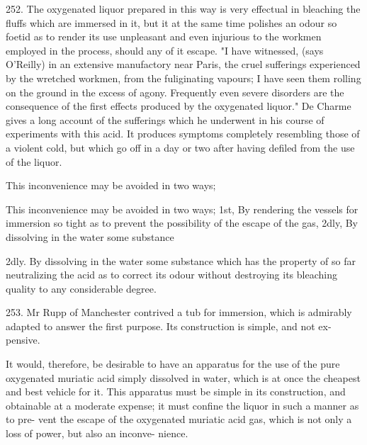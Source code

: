 \documentclass{article}
\begin{document}
252. The oxygenated liquor prepared in this way is very effectual in bleaching the fluffs which are immersed in it, but it at the same time polishes an odour so foetid as to render its use unpleasant and even injurious to the workmen employed in the process, should any of it escape. "I have witnessed, (says O'Reilly) in an extensive manufactory near Paris, the cruel sufferings experienced by the wretched workmen, from the fuliginating vapours; I have seen them rolling on the ground in the excess of agony. Frequently even severe disorders are the consequence of the first effects produced by the oxygenated liquor." De Charme gives a long account of the sufferings which he underwent in his course of experiments with this acid. It produces symptoms completely resembling those of a violent cold, but which go off in a day or two after having defiled from the use of the liquor.

This inconvenience may be avoided in two ways;

This inconvenience may be avoided in two ways; 1st, By rendering the vessels for immersion so tight as to prevent the possibility of the escape of the gas, 2dly, By dissolving in the water some substance

2dly. By dissolving in the water some substance which has the property of so far neutralizing the acid as to correct its odour without destroying its bleaching quality to any considerable degree.

253. Mr Rupp of Manchester contrived a tub for
immersion, which is admirably adapted to answer the
first purpose. Its construction is simple, and not ex-
pensive.

It would, therefore, be desirable to have an apparatus
for the use of the pure oxygenated muriatic acid simply
dissolved in water, which is at once the cheapest and
best vehicle for it. This apparatus must be simple in
its construction, and obtainable at a moderate expense;
it must confine the liquor in such a manner as to pre-
vent the escape of the oxygenated muriatic acid gas,
which is not only a loss of power, but also an inconve-
nience.
\end{document}
